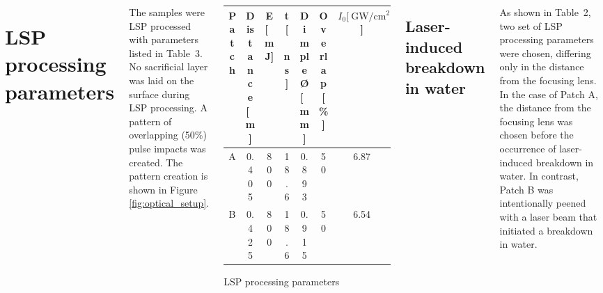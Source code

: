 \documentclass[20pt,margin=1in,innermargin=-4.5in,blockverticalspace=-0.25in]{tikzposter}
\begin{document}
\begin{columns}
{    \section*{LSP processing parameters}

    The samples were LSP processed with parameters listed in Table~3. No sacrificial layer was laid on the surface during LSP processing. A  pattern of overlapping (50\%) pulse impacts was created. The pattern creation is shown in Figure \ref{fig:optical_setup}.

    \begin{center}  

    \begin{threeparttable}
        \centering
        \begin{tabular}{|c|c | c| c| c| c| c|} 
        \hline
           \textbf{Patch} & \textbf{Distance [\SI{}{\m}]} & \textbf{E [\SI{}{\milli\joule}]} & \textbf{t [\SI{}{\ns}]} & \textbf{Dimple Ø [\SI{}{ \mm}]}  & \textbf{Overlap [\%] } & \textbf{\( I_0  [\SI[]{}{\giga\watt/\cm^2} \)] }\\ [0.5ex] 
  
        \hline
         A & 0.405 &  800   & 18.6 & 0.893 & 50 & 6.87  \\

        \hline
         B & 0.425 &  800   & 18.6 & 0.915 & 50 & 6.54  \\

        \hline
        \end{tabular}

        \caption[Litron~LPY~ST~7875-10~2HG parameters]{LSP processing parameters}
        
       
    \end{threeparttable}

    \label{tab:xrdparameters}
    \end{center}

    
    \subsection*{Laser-induced breakdown in water}
    As shown in Table~2, two set of LSP processing parameters were chosen, differing only in the distance from the focusing lens. In the case of Patch A, the distance from the focusing lens was chosen before the occurrence of laser-induced breakdown in water. In contrast, Patch B was intentionally peened with a laser beam that initiated a breakdown in water.  


}
\end{columns}
\end{document}
